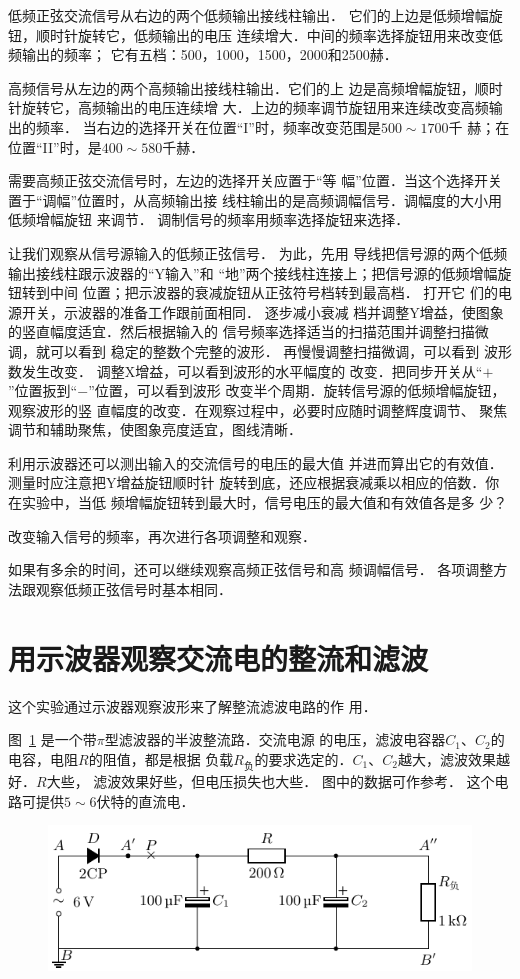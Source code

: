 低频正弦交流信号从右边的两个低频输出接线柱输出．
它们的上边是低频增幅旋钮，顺时针旋转它，低频输出的电压
连续增大．中间的频率选择旋钮用来改变低频输出的频率；
它有五档：500，1000，1500，2000和2500赫．

高频信号从左边的两个高频输出接线柱输出．它们的上
边是高频增幅旋钮，顺时针旋转它，高频输出的电压连续增
大．上边的频率调节旋钮用来连续改变高频输出的频率．
当右边的选择开关在位置“I”时，频率改变范围是$500 \sim 1700$千
赫；在位置“II”时，是$400 \sim 580$千赫．

需要高频正弦交流信号时，左边的选择开关应置于“等
幅”位置．当这个选择开关置于“调幅”位置时，从高频输出接
线柱输出的是高频调幅信号．调幅度的大小用低频增幅旋钮
来调节．
调制信号的频率用频率选择旋钮来选择．

让我们观察从信号源输入的低频正弦信号．
为此，先用
导线把信号源的两个低频输出接线柱跟示波器的“Y输入”和
“地”两个接线柱连接上；把信号源的低频增幅旋钮转到中间
位置；把示波器的衰减旋钮从正弦符号档转到最高档．
打开它
们的电源开关，示波器的准备工作跟前面相同．
逐步减小衰减
档并调整Y增益，使图象的竖直幅度适宜．然后根据输入的
信号频率选择适当的扫描范围并调整扫描微调，就可以看到
稳定的整数个完整的波形．
再慢慢调整扫描微调，可以看到
波形数发生改变．
调整X增益，可以看到波形的水平幅度的
改变．把同步开关从“$+$”位置扳到“$-$”位置，可以看到波形
改变半个周期．旋转信号源的低频增幅旋钮，观察波形的竖
直幅度的改变．在观察过程中，必要时应随时调整辉度调节、
聚焦调节和辅助聚焦，使图象亮度适宜，图线清晰．

利用示波器还可以测出输入的交流信号的电压的最大值
并进而算出它的有效值．测量时应注意把Y增益旋钮顺时针
旋转到底，还应根据衰减乘以相应的倍数．你在实验中，当低
频增幅旋钮转到最大时，信号电压的最大值和有效值各是多
少？

改变输入信号的频率，再次进行各项调整和观察．

如果有多余的时间，还可以继续观察高频正弦信号和高
频调幅信号．
各项调整方法跟观察低频正弦信号时基本相同．

\section{用示波器观察交流电的整流和滤波}\label{sec_C_app_01-4}

这个实验通过示波器观察波形来了解整流滤波电路的作
用．

图~\ref{fig_C_10-4} 是一个带$\pi$型滤波器的半波整流路．交流电源
的电压，滤波电容器$C_1$、$C_2$的电容，电阻$R$的阻值，都是根据
负载$R_{\text{负}}$的要求选定的．$C_1$、$C_2$越大，滤波效果越好．$R$大些，
滤波效果好些，但电压损失也大些．
图中的数据可作参考．
这个电路可提供$5 \sim 6$伏特的直流电．
\begin{figure}[htbp]
    \centering
    \includegraphics{fig/C/10-4.pdf}
    \caption{}\label{fig_C_10-4}
\end{figure}

